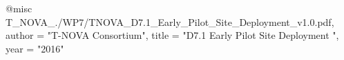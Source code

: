 @misc{ T_NOVA_./WP7/TNOVA_D7.1_Early_Pilot_Site_Deployment_v1.0.pdf,
       author = "T-NOVA Consortium",
       title = "D7.1 Early Pilot Site Deployment ",
       year = "2016" }
